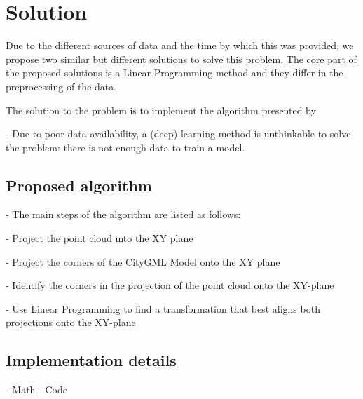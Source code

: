

    \chapter{Solution}

    Due to the different sources of data and the time by which this was provided, we propose two similar but different solutions to solve this problem.
    The core part of the proposed solutions is a Linear Programming method and they differ in the preprocessing of the data.

    The solution to the problem is to implement the algorithm presented by \cite{Goebbels_2018_linebased} 
    
    - Due to poor data availability, a (deep) learning method is unthinkable to solve the problem: there is not enough data to train a model. \par
    

    \section{Proposed algorithm}
    - The main steps of the algorithm are listed as follows: \par
    - Project the point cloud into the XY plane \par
    - Project the corners of the CityGML Model onto the XY plane \par
    - Identify the corners in the projection of the point cloud onto the XY-plane \par
    - Use Linear Programming to find a transformation that best aligns both projections onto the XY-plane \par

    \section{Implementation details}
    - Math
    - Code


